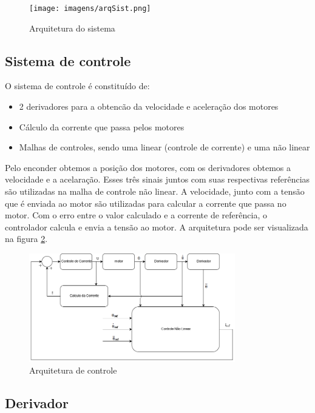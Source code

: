 \documentclass[]{politex}
\begin{document}
\begin{figure}[H]
    \centering
    \texttt{[image: imagens/arqSist.png]}
    \caption{Arquitetura do sistema}
    \label{arquitSistema}
\end{figure}

\subsection{Sistema de controle}

O sistema de controle é constituído de: 
\begin{itemize}
\item 2 derivadores para a obtencão da velocidade e aceleração dos motores
\item Cálculo da corrente que passa pelos motores
\item Malhas de controles, sendo uma linear (controle de corrente) e uma não linear 
\end{itemize} 

Pelo enconder obtemos a posição dos motores, com os derivadores obtemos a velocidade e a acelaração. Esses três sinais juntos com suas respectivas referências são utilizadas na malha de controle não linear. A velocidade, junto com a tensão que é enviada ao motor são utilizadas para calcular a corrente que passa no motor. Com o erro entre o valor calculado e a corrente de referência, o controlador calcula e envia a tensão ao motor. A arquitetura pode ser visualizada na figura \ref{arquitControle}.


\begin{figure}[H]
    \centering
    \includegraphics[width=0.8\textwidth]{imagens/ArqControle.png}
    \caption{Arquitetura de controle}
    \label{arquitControle}
\end{figure}

\subsection{Derivador}
\label{derivador}
\end{document}
